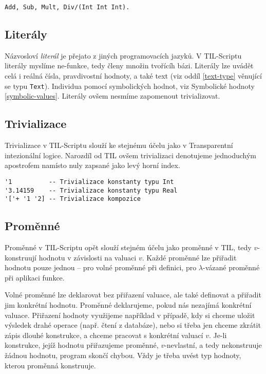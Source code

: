 \begin{lstlisting}[caption={Deklarace funkcí}]
Add, Sub, Mult, Div/(Int Int Int).
\end{lstlisting}

\subsection{Literály}

Názvosloví \textit{literál} je přejato z jiných programovacích jazyků. V TIL-Scriptu literály
myslíme ne-funkce, tedy členy množin tvořícíh bázi. Literály lze uvádět celá i reálná čísla,
pravdivostní hodnoty, a také text (viz oddíl \ref{text-type} věnující se typu \lstinline{Text}).
Individua pomocí symbolických hodnot, viz Symbolické hodnoty \ref{symbolic-values}. Literály ovšem
nesmíme zapomenout trivializovat.

\subsection{Trivializace}

Trivializace v TIL-Scriptu slouží ke stejnému účelu jako v Transparentní intezionální logice.
Narozdíl od TIL ovšem trivializaci denotujeme jednoduchým apostrofem namísto nuly zapsané jako
levý horní index.

\begin{lstlisting}[caption={Příklad trivializace.}]
'1          -- Trivializace konstanty typu Int
'3.14159    -- Trivializace konstanty typu Real
'['+ '1 '2] -- Trivializace kompozice
\end{lstlisting}

\subsection{Proměnné}

Proměnné v TIL-Scriptu opět slouží stejném účelu jako proměnné v TIL, tedy $v$-konstruují hodnotu
v závislosti na valuaci $v$. Každé proměnné lze přiřadit hodnotu pouze jednou -- pro volné proměnné
při definici, pro $\lambda$-vázané proměnné při aplikaci funkce.

Volné proměnné lze deklarovat bez přiřazení valuace, ale také definovat a přiřadit jim konkrétní
hodnotu. Proměnné deklarujeme, pokud nás nezajímá konkrétní valuace. Přiřazení hodnoty využijeme
například v případě, kdy si chceme uložit výsledek drahé operace (např. čtení z databáze), nebo
si třeba jen chceme zkrátit zápis dlouhé konstrukce, a chceme pracovat s konkrétní valuací $v$.
Je-li konstrukce, jejíž hodnotu přiřazujeme proměnné, $v$-nevlastní, a tedy nekonstruuje žádnou
hodnotu, program skončí chybou. Vždy je třeba uvést typ hodnoty, kterou proměnná konstruuje.

